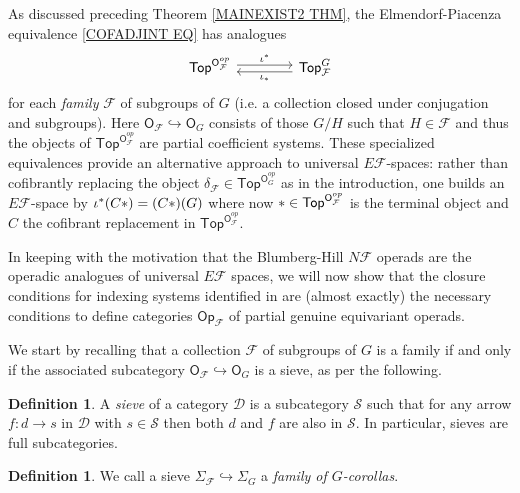 \documentclass[a4paper,10pt
,draft
]{article}%
\numberwithin{equation}{section}
\numberwithin{figure}{section}
\theoremstyle{definition} %
\newtheorem{definition}[equation]{Definition}%
\newcommand{\1}{\ensuremath{\mathbbm 1}}%
\begin{document}
As discussed preceding Theorem \ref{MAINEXIST2 THM},
the Elmendorf-Piacenza equivalence
\eqref{COFADJINT EQ} has analogues
\[
\begin{tikzcd}[column sep =4em,row sep=0.3em]
	\mathsf{Top}^{\mathsf{O}_{\mathcal{F}}^{op}}
	\ar[shift left=1]{r}{\iota^{\**}} 
&
	\mathsf{Top}_{\mathcal{F}}^G
	\ar[shift left=1]{l}{\iota_{\**}}
\end{tikzcd}
\]
for each \textit{family} $\mathcal{F}$ of subgroups of $G$
(i.e. a collection closed under conjugation and subgroups).
Here $\mathsf{O}_\mathcal{F} \hookrightarrow \mathsf{O}_G$ consists of those $G/H$ such that $H \in \mathcal{F}$ 
and thus the objects of
$\mathsf{Top}^{\mathsf{O}_{\mathcal{F}}^{op}}$
are partial coefficient systems.
These specialized equivalences provide an alternative approach to universal 
$E \mathcal{F}$-spaces: rather than cofibrantly replacing the object
$\delta_{\mathcal{F}} \in \mathsf{Top}^{\mathsf{O}_G^{op}}$
as in the introduction,
one builds an $E \mathcal{F}$-space by
$\iota^{\**}(C \**) = (C *) (G)$
where now $\** \in \mathsf{Top}^{\mathsf{O}_{\mathcal{F}}^{op}}$
is the terminal object and $C$ the cofibrant replacement in $\mathsf{Top}^{\mathsf{O}_{\mathcal{F}}^{op}}$.

In keeping with the motivation that the Blumberg-Hill $N \mathcal{F}$ operads are the operadic analogues of universal $E \mathcal{F}$ spaces,
we will now show that the closure conditions for 
indexing systems
identified in \cite[Def. 3.22]{BH15}
are (almost exactly) the necessary conditions to define categories 
$\mathsf{Op}_{\mathcal{F}}$
of partial genuine equivariant operads.

We start by recalling that 
a collection $\mathcal F$ of subgroups of $G$
is a family %
if and only if the associated subcategory 
$\mathsf{O}_{\mathcal{F}} \hookrightarrow
\mathsf{O}_G$ is a sieve, as per the following.


\begin{definition}
	A \textit{sieve} of a category $\mathcal{D}$
	is a subcategory $\mathcal{S}$ such that
	for any arrow $f \colon d \to s$ in $\mathcal{D}$ with 
	$s \in \mathcal{S}$ then both $d$ and $f$ are also in $\mathcal{S}$. 
	In particular, sieves are full subcategories.
\end{definition}

\begin{definition}\label{FAMILY_COROLLAS_DEF}
      We call a sieve
      $\Sigma_{\mathcal{F}} \hookrightarrow \Sigma_G$
      a \textit{family of $G$-corollas}.
\end{definition}
\end{document}
